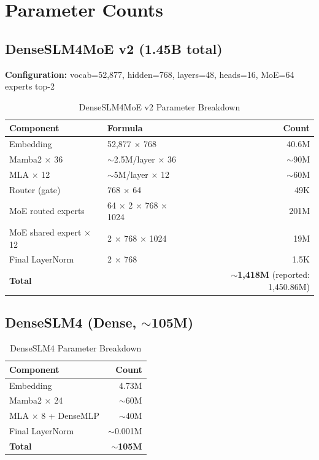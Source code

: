 \section{Parameter Counts}
\label{sec:parameters}

\subsection{DenseSLM4MoE v2 (1.45B total)}

\textbf{Configuration:} vocab=52,877, hidden=768, layers=48, heads=16, MoE=64 experts top-2

\begin{table}[h]
    \centering
    \caption{DenseSLM4MoE v2 Parameter Breakdown}
    \begin{tabular}{llr}
        \toprule
        \textbf{Component} & \textbf{Formula} & \textbf{Count} \\
        \midrule
        Embedding & 52,877 $\times$ 768 & 40.6M \\
        Mamba2 $\times$ 36 & $\sim$2.5M/layer $\times$ 36 & $\sim$90M \\
        MLA $\times$ 12 & $\sim$5M/layer $\times$ 12 & $\sim$60M \\
        Router (gate) & 768 $\times$ 64 & 49K \\
        MoE routed experts & 64 $\times$ 2 $\times$ 768 $\times$ 1024 & 201M \\
        MoE shared expert $\times$ 12 & 2 $\times$ 768 $\times$ 1024 & 19M \\
        Final LayerNorm & 2 $\times$ 768 & 1.5K \\
        \midrule
        \textbf{Total} & & \textbf{$\sim$1,418M} (reported: 1,450.86M) \\
        \bottomrule
    \end{tabular}
\end{table}

\subsection{DenseSLM4 (Dense, $\sim$105M)}

\begin{table}[h]
    \centering
    \caption{DenseSLM4 Parameter Breakdown}
    \begin{tabular}{lr}
        \toprule
        \textbf{Component} & \textbf{Count} \\
        \midrule
        Embedding & 4.73M \\
        Mamba2 $\times$ 24 & $\sim$60M \\
        MLA $\times$ 8 + DenseMLP & $\sim$40M \\
        Final LayerNorm & $\sim$0.001M \\
        \midrule
        \textbf{Total} & \textbf{$\sim$105M} \\
        \bottomrule
    \end{tabular}
\end{table}

